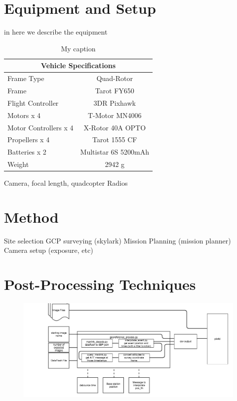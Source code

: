 \documentclass{article}
\begin{document}
\section{Equipment and Setup}
\label{sec:equipment}in
here we describe the equipment
\begin{table}[]
\centering
\caption{My caption}
\label{my-label}
\begin{tabular}{|l|c|}
\hline
\multicolumn{2}{|c|}{Vehicle Specifications} \\ \hline
Frame Type            & Quad-Rotor           \\ \hline
Frame                 & Tarot FY650          \\ \hline
Flight Controller     & 3DR Pixhawk          \\ \hline
Motors x 4            & T-Motor MN4006       \\ \hline
Motor Controllers x 4 & X-Rotor 40A OPTO     \\ \hline
Propellers x 4        & Tarot 1555 CF        \\ \hline
Batteries x 2         & Multistar 6S 5200mAh \\ \hline
Weight                & 2942 g               \\ \hline
\end{tabular}
\end{table}
Camera, focal length, quadcopter
Radios
\section{Method}
\label{sec:method}
Site selection
GCP surveying (skylark)
Mission Planning (mission planner)
Camera setup (exposure, etc)
\section{Post-Processing Techniques}
\begin{figure}
\begin{center}
\includegraphics[width=7in]{images/uav_survey_processing_architecture.png}
\end{center}
\end{figure}
\end{document}
